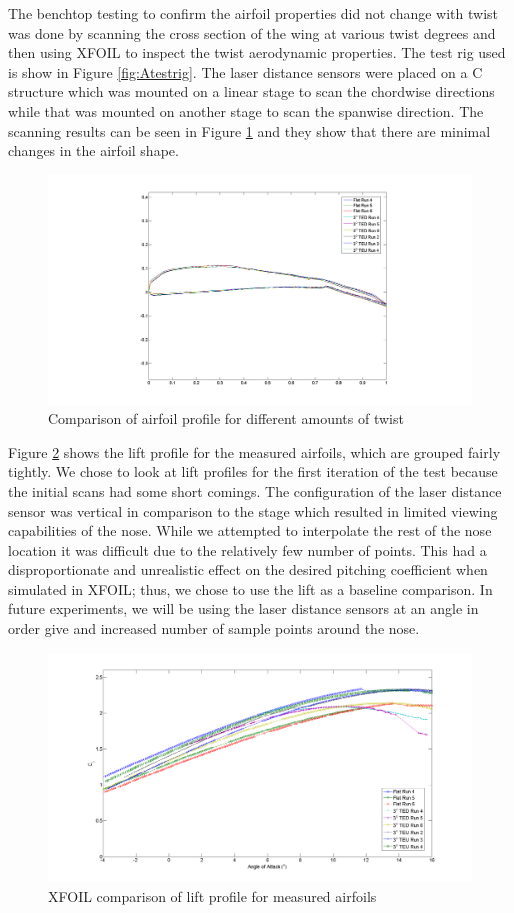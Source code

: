 \documentclass[11pt]{ucthesis}
\begin{document}
The benchtop testing to confirm the airfoil properties did not change with twist was done by scanning the cross section of the wing at various twist degrees and then using XFOIL to inspect the twist aerodynamic properties. The test rig used is show in Figure \ref{fig:Atestrig}. The laser distance sensors were placed on a C structure which was mounted on a linear stage to scan the chordwise directions while that was mounted on another stage to scan the spanwise direction. The scanning results can be seen in Figure \ref{fig:Ascan} and they show that there are minimal changes in the airfoil shape.

\begin{figure}[h]
\centering
\includegraphics[width=0.75\linewidth]{Figures/AirfoilDirectMeasurements.png}
\caption{Comparison of airfoil profile for different amounts of twist}
\label{fig:Ascan}
\end{figure}

Figure \ref{fig:Alift} shows the lift profile for the measured airfoils, which are grouped fairly tightly. We chose to look at lift profiles for the first iteration of the test because the initial scans had some short comings. The configuration of the laser distance sensor was vertical in comparison to the stage which resulted in limited viewing capabilities of the nose. While we attempted to interpolate the rest of the nose location it was difficult due to the relatively few number of points. This had a disproportionate and unrealistic effect on the desired pitching coefficient when simulated in XFOIL; thus, we chose to use the lift as a baseline comparison. In future experiments, we will be using the laser distance sensors at an angle in order give and increased number of sample points around the nose.

\begin{figure}[thpb]
\centering
\includegraphics[width=0.75\linewidth]{Figures/CLDirectMeasurements.png}
\caption{XFOIL comparison of lift profile for measured airfoils}
\label{fig:Alift}
\end{figure}
\end{document}
